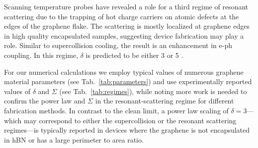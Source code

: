 \documentclass[aip, amsmath,amssymb, reprint]{revtex4-1}
\begin{document}
Scanning temperature probes have revealed a role for a third regime of resonant scattering due to the trapping of hot charge carriers on atomic defects at the edges of the graphene flake\cite{Wehling.2010,Halbertal.2017,Kong.2018}. The scattering is mostly localized at graphene edges in high quality encapsulated samples, suggesting device fabrication may play a role\cite{Halbertal.2017,Draelos.2019,Lee.2020}. Similar to supercollision cooling, the result is an enhancement in e-ph coupling. In this regime, $\delta$ is predicted to be either 3 or 5 \cite{Kong.2018}. 

For our numerical calculations we employ typical values of numerous graphene material parameters (see Tab.\ \ref{tab:parameters}) and use experimentally reported values of $\delta$ and $\Sigma$ (see Tab.\ \ref{tab:regimes}), while noting more work is needed to confirm the power law and $\Sigma$ in the resonant-scattering regime for different fabrication methods. In contrast to the clean limit, a power law scaling of $\delta =3$---which may correspond to either the supercollision or the resonant scattering regimes---is typically reported in devices where the graphene is not encapsulated in hBN or has a large perimeter to area ratio\cite{Betz.2012,Graham.2013, Somphonsane.2013, Eless.2013,Fong.2013,Draelos.2019, Lee.2020}.
\end{document}
